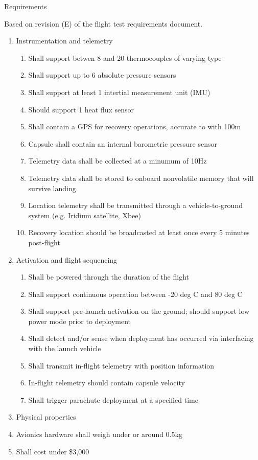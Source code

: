 \documentclass[UKenglish]{beamer}
\newcommand{\ddrev}{E}
\begin{document}
\begin{frame}[allowframebreaks]{Requirements}

	Based on revision (\ddrev) of the flight test requirements document.
	
	\begin{enumerate}
		\item Instrumentation and telemetry
		\begin{enumerate}
			\item Shall support betwen 8 and 20 thermocouples of varying type
			\item Shall support up to 6 absolute pressure sensors
			\item Shall support at least 1 intertial measurement unit (IMU)
			\item Should support 1 heat flux sensor
			\item Shall contain a GPS for recovery operations, accurate to with 100m
			\item Capsule shall contain an internal barometric pressure sensor 
			\item Telemetry data shall be collected at a minumum of 10Hz
			\item Telemetry data shall be stored to onboard nonvolatile memory that will survive landing
			\item Location telemetry shall be transmitted through a vehicle-to-ground system (e.g. Iridium satellite, Xbee)
			\item Recovery location should be broadcasted at least once every 5 minutes post-flight
		\end{enumerate}
		\item Activation and flight sequencing
		\begin{enumerate}
			\item Shall be powered through the duration of the flight
			\item Shall support continuous operation between -20 deg C and 80 deg C
			\item Shall support pre-launch activation on the ground; should support low power mode prior to deployment
			\item Shall detect and/or sense when deployment has occurred via interfacing with the launch vehicle
			\item Shall transmit in-flight telemetry with position information
			\item In-flight telemetry should contain capsule velocity 
			\item Shall trigger parachute deployment at a specified time
		\end{enumerate}
		\item Physical properties
		\item Avionics hardware shall weigh under or around 0.5kg
		\item Shall cost under \$3,000
	\end{enumerate}
\end{frame}
\end{document}
